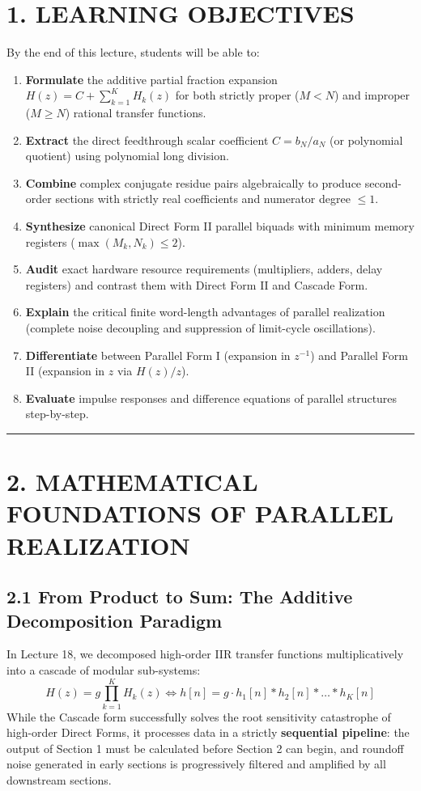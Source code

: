 \documentclass[11pt,a4paper]{article}
\begin{document}
\section{1. LEARNING OBJECTIVES}
By the end of this lecture, students will be able to:
\begin{enumerate}
    \item \textbf{Formulate} the additive partial fraction expansion $H(z) = C + \sum_{k=1}^K H_k(z)$ for both strictly proper ($M < N$) and improper ($M \ge N$) rational transfer functions.
    \item \textbf{Extract} the direct feedthrough scalar coefficient $C = b_N / a_N$ (or polynomial quotient) using polynomial long division.
    \item \textbf{Combine} complex conjugate residue pairs algebraically to produce second-order sections with strictly real coefficients and numerator degree $\le 1$.
    \item \textbf{Synthesize} canonical Direct Form II parallel biquads with minimum memory registers ($\max(M_k, N_k) \le 2$).
    \item \textbf{Audit} exact hardware resource requirements (multipliers, adders, delay registers) and contrast them with Direct Form II and Cascade Form.
    \item \textbf{Explain} the critical finite word-length advantages of parallel realization (complete noise decoupling and suppression of limit-cycle oscillations).
    \item \textbf{Differentiate} between Parallel Form I (expansion in $z^{-1}$) and Parallel Form II (expansion in $z$ via $H(z)/z$).
    \item \textbf{Evaluate} impulse responses and difference equations of parallel structures step-by-step.
\end{enumerate}

\noindent\rule{\textwidth}{0.5pt}

\section{2. MATHEMATICAL FOUNDATIONS OF PARALLEL REALIZATION}

\subsection{2.1 From Product to Sum: The Additive Decomposition Paradigm}
In Lecture 18, we decomposed high-order IIR transfer functions multiplicatively into a cascade of modular sub-systems:
\begin{equation}
H(z) = g \prod_{k=1}^K H_k(z) \iff h[n] = g \cdot h_1[n] * h_2[n] * \dots * h_K[n]
\end{equation}
While the Cascade form successfully solves the root sensitivity catastrophe of high-order Direct Forms, it processes data in a strictly \textbf{sequential pipeline}: the output of Section 1 must be calculated before Section 2 can begin, and roundoff noise generated in early sections is progressively filtered and amplified by all downstream sections.
\end{document}
